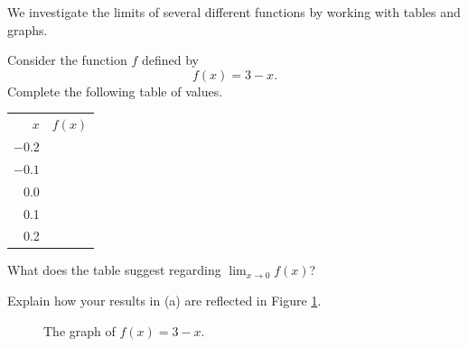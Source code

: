\begin{pa} \label{PA:10.1} 
We investigate the limits of several different functions by working with tables and graphs.
\ba
\item Consider the function $f$ defined by 
  $$
  f(x) = 3-x.
  $$
  Complete the following table of values.
  \begin{center}
    \begin{tabular}{|r|c|}
      \hline      
      $x$ & $f(x)$ \\
      \hhline{|=|=|}
      $-0.2$ & \hspace*{1in} \\
      \hline
      $-0.1$ & \hspace*{1in} \\
      \hline
      0.0 & \hspace*{1in} \\
      \hline
      0.1 & \hspace*{1in} \\
      \hline
      0.2 & \hspace*{1in} \\
      \hline
    \end{tabular}
  \end{center}
  What does the table suggest regarding $\lim_{x\to 0}f(x)$?

\item Explain how your results in (a) are reflected in Figure
  \ref{F:10.1.activity.1}. 

  \begin{figure}[ht]
    \begin{center}
      \caption{The graph of $f(x) = 3-x$.}
      \label{F:10.1.activity.1}
    \end{center}
  \end{figure}
      

\end{pa}
